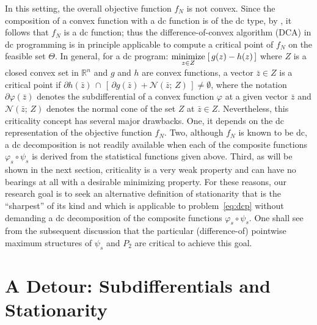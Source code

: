 \documentclass{siamart}
\begin{document}
In this setting, the overall objective function $f_N$ is not convex.
Since the composition of a convex function with a dc function is of the dc type,
by \cite[Theorem II, page 708]{Hartman1959}, it follows that $f_N$ is a dc function; thus the difference-of-convex
algorithm (DCA) in dc programming \cite{LeThiPham05,LeHuynhPham09} is in principle applicable to compute a critical point
of $f_N$ on the feasible set $\Theta$. In general, for a dc program:
$\displaystyle\operatornamewithlimits{\mbox{minimize}}_{z\in Z} \;[\,g(z)-h(z)\,]$ where $Z$ is a closed convex set in $\mathbb{R}^n$
and $g$ and $h$ are convex functions, a vector $\bar{z}\in Z$ is a critical point if
$\partial h(\bar{z}) \, \cap \, [ \, \partial g(\bar{z})+ \mathcal{N}(\bar{z}; \, Z)\, ] \neq  \emptyset$,
where the notation $\partial \varphi(\bar{z})$ denotes the subdifferential of a convex function $\varphi$ at a given vector $\bar{z}$ and $\mathcal{N}(\bar{z};\, Z)$
denotes the normal cone of the set $Z$ at $\bar{z}\in Z$. Nevertheless, this criticality concept has several major drawbacks.
One, it depends on the dc representation of the objective function $f_N$. Two, although $f_N$ is known to be dc, a
dc decomposition is not readily available when each of the composite functions $\varphi_s \circ \psi_s$ is derived from
the statistical functions given above.  Third, as will be shown in the next section, criticality is a very weak property
and can have no bearings at all with a desirable minimizing property. For these reasons, our research goal is to seek an alternative definition of stationarity
that is the ``sharpest'' of its kind and which is applicable to  problem~\eqref{eq:dcp} without demanding a dc decomposition of the composite  functions
$\varphi_s \circ \psi_s$.
One shall see from the subsequent discussion that the particular (difference-of) pointwise maximum structures of $\psi_s$ and $P_2$ are critical
to achieve this goal.



\section{A Detour: Subdifferentials and Stationarity}  \label{sec: preliminary}
\end{document}

